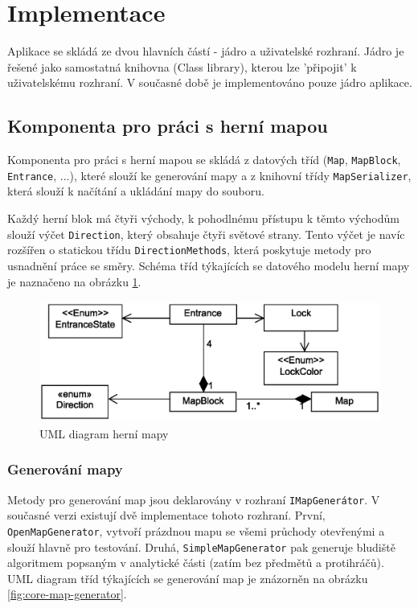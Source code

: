 \documentclass[11pt,a4paper]{scrartcl}
\begin{document}
	\section{Implementace}
	
	Aplikace se skládá ze dvou hlavních částí - jádro a uživatelské rozhraní. Jádro je řešené jako samostatná knihovna (Class library), kterou lze 'připojit' k uživatelskému rozhraní. V současné době je implementováno pouze jádro aplikace.
	
	\subsection{Komponenta pro práci s herní mapou}
	Komponenta pro práci s herní mapou se skládá z datových tříd (\verb|Map|, \verb|MapBlock|, \verb|Entrance|, ...), které slouží ke generování mapy a z knihovní třídy \verb|MapSerializer|, která slouží k načítání a ukládání mapy do souboru.
	
	Každý herní blok má čtyři východy, k pohodlnému přístupu k těmto východům slouží výčet \verb|Direction|, který obsahuje čtyři světové strany. Tento výčet je navíc rozšířen o statickou třídu \verb|DirectionMethods|, která poskytuje metody pro usnadnění práce se směry. Schéma tříd týkajících se datového modelu herní mapy je naznačeno na obrázku \ref{fig:core-map}.
	
	\begin{figure}[H]
		\centering
		\includegraphics[height=40mm]{core-map-simple}
		\caption{UML diagram herní mapy}
		\label{fig:core-map}
	\end{figure}
	
	
	
	\subsubsection{Generování mapy}
	Metody pro generování map jsou deklarovány v rozhraní \verb|IMapGenerátor|. V současné verzi existují dvě implementace tohoto rozhraní. První, \verb|OpenMapGenerator|, vytvoří prázdnou mapu se všemi průchody otevřenými a slouží hlavně pro testování. Druhá, \verb|SimpleMapGenerator| pak generuje bludiště algoritmem popsaným v analytické části (zatím bez předmětů a protihráčů). UML diagram tříd týkajících se generování map je znázorněn na obrázku \ref{fig:core-map-generator}.
	
\end{document}
